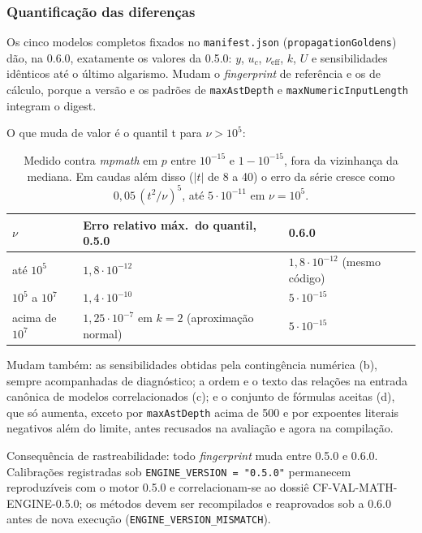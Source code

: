 \documentclass[11pt,a4paper]{article}
\newcommand{\docVersion}{0.6.0}
\newcommand{\previousVersion}{0.5.0}
\begin{document}
\subsubsection*{Quantificação das diferenças}

Os cinco modelos completos fixados no \texttt{manifest.json} (\texttt{propagationGoldens}) dão, na \docVersion{}, exatamente os valores da \previousVersion{}: \(y\), \(u_c\), \(\nu_{\text{eff}}\), \(k\), \(U\) e sensibilidades idênticos até o último algarismo. Mudam o \emph{fingerprint} de referência e os de cálculo, porque a versão e os padrões de \texttt{maxAstDepth} e \texttt{maxNumericInputLength} integram o digest.

O que muda de valor é o quantil t para \(\nu > 10^5\):

\begin{table}[H]
  \centering
  \small
  \begin{tabularx}{\textwidth}{l X X}
    \toprule
    \textbf{\(\nu\)} & \textbf{Erro relativo máx.\ do quantil, \previousVersion} & \textbf{\docVersion} \\
    \midrule
    até \(10^5\)              & \(1{,}8 \cdot 10^{-12}\) & \(1{,}8 \cdot 10^{-12}\) (mesmo código) \\
    \(10^5\) a \(10^7\)       & \(1{,}4 \cdot 10^{-10}\) & \(5 \cdot 10^{-15}\) \\
    acima de \(10^7\)         & \(1{,}25 \cdot 10^{-7}\) em \(k = 2\) (aproximação normal) & \(5 \cdot 10^{-15}\) \\
    \bottomrule
  \end{tabularx}
  \caption*{\small Medido contra \emph{mpmath} em \(p\) entre \(10^{-15}\) e \(1 - 10^{-15}\), fora da vizinhança da mediana. Em caudas além disso (\(|t|\) de 8 a 40) o erro da série cresce como \(0{,}05\,(t^2/\nu)^5\), até \(5 \cdot 10^{-11}\) em \(\nu = 10^5\).}
\end{table}

Mudam também: as sensibilidades obtidas pela contingência numérica (b), sempre acompanhadas de diagnóstico; a ordem e o texto das relações na entrada canônica de modelos correlacionados (c); e o conjunto de fórmulas aceitas (d), que só aumenta, exceto por \texttt{maxAstDepth} acima de 500 e por expoentes literais negativos além do limite, antes recusados na avaliação e agora na compilação.

Consequência de rastreabilidade: todo \emph{fingerprint} muda entre \previousVersion{} e \docVersion{}. Calibrações registradas sob \texttt{ENGINE\_VERSION = "\previousVersion"} permanecem reproduzíveis com o motor \previousVersion{} e correlacionam-se ao dossiê CF-VAL-MATH-ENGINE-0.5.0; os métodos devem ser recompilados e reaprovados sob a \docVersion{} antes de nova execução (\texttt{ENGINE\_VERSION\_MISMATCH}).
\end{document}
